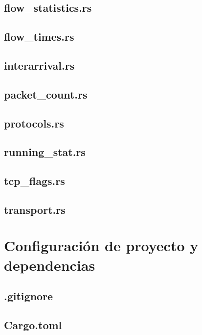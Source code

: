\documentclass[11pt]{report}
\begin{document}
\section{flow\_statistics.rs}


\section{flow\_times.rs}


\section{interarrival.rs}


\section{packet\_count.rs}


\section{protocols.rs}


\section{running\_stat.rs}


\section{tcp\_flags.rs}


\section{transport.rs}


\chapter{Configuración de proyecto y dependencias}

\section{.gitignore}


\section{Cargo.toml}

\end{document}
